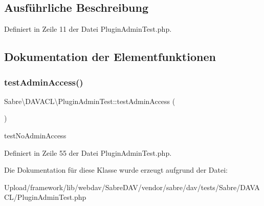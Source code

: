 \subsection{Ausführliche Beschreibung}


Definiert in Zeile 11 der Datei Plugin\+Admin\+Test.\+php.



\subsection{Dokumentation der Elementfunktionen}
\mbox{\label{class_sabre_1_1_d_a_v_a_c_l_1_1_plugin_admin_test_ab8462f349aa54c62fcda1d3ac1c19581}} 
\subsubsection{\texorpdfstring{test\+Admin\+Access()}{testAdminAccess()}}
{\footnotesize\ttfamily Sabre\textbackslash{}\+D\+A\+V\+A\+C\+L\textbackslash{}\+Plugin\+Admin\+Test\+::test\+Admin\+Access (\begin{DoxyParamCaption}{ }\end{DoxyParamCaption})}

test\+No\+Admin\+Access 

Definiert in Zeile 55 der Datei Plugin\+Admin\+Test.\+php.



Die Dokumentation für diese Klasse wurde erzeugt aufgrund der Datei\+:\begin{DoxyCompactItemize}
\item 
Upload/framework/lib/webdav/\+Sabre\+D\+A\+V/vendor/sabre/dav/tests/\+Sabre/\+D\+A\+V\+A\+C\+L/Plugin\+Admin\+Test.\+php\end{DoxyCompactItemize}
